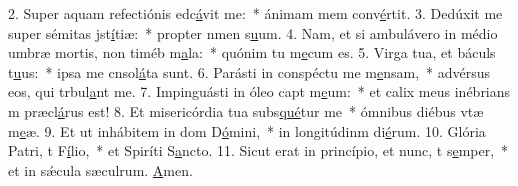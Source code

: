 2. Super aquam refectiónis edc\uline{á}vit me:~* ánimam mem conv\uline{é}rtit.
3. Dedúxit me super sémitas jst\uline{í}tiæ:~* propter nmen s\uline{u}um.
4. Nam, et si ambulávero in médio umbræ mortis, non timéb m\uline{a}la:~* quónim tu m\uline{e}cum es.
5. Virga tua, et báculs t\uline{u}us:~* ipsa me cnsol\uline{á}ta sunt.
6. Parásti in conspéctu me m\uline{e}nsam,~* advérsus eos, qui trbul\uline{a}nt me.
7. Impinguásti in óleo capt m\uline{e}um:~* et calix meus inébrians m præcl\uline{á}rus est!
8. Et misericórdia tua subs\uline{qué}tur me~* ómnibus diébus vtæ m\uline{e}æ.
9. Et ut inhábitem in dom D\uline{ó}mini,~* in longitúdinm di\uline{é}rum.
10. Glória Patri, t F\uline{í}lio,~* et Spiríti S\uline{a}ncto.
11. Sicut erat in princípio, et nunc, t s\uline{e}mper,~* et in sǽcula sæculrum. \uline{A}men.
